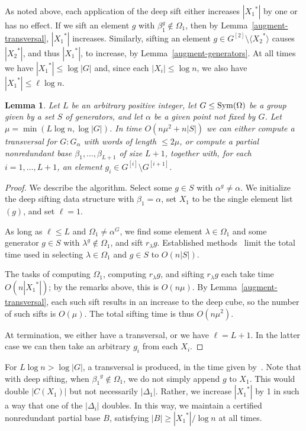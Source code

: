 \documentclass[12pt]{article}
\newcommand{\Sym}{{\rm Sym}}
\newtheorem{lemma}[theorem]{Lemma}
\begin{document}
As noted above, each application of the deep sift either
increases $|{X_1}^*|$ by one or has no effect.  
If we sift an element $g$
with $\beta_1^g\not\in\Omega_1$,
then by Lemma~\ref{augment-transversal}, $|{X_1}^*|$ increases.
Similarly, sifting an element 
$g\in G^{[2]}\setminus \langle {X_2}^*\rangle$ 
causes $|{X_2}^*|$, and thus $|{X_1}^*|$,
to increase, by Lemma~\ref{augment-generators}.
At all times we have $|{X_1}^*|\leq\log|G|$ and,
since each $|X_i|\leq\log n$,
we also have $|{X_1}^*|\leq\ell\log n$.

\begin{lemma}\label{transversal}
  Let $L$ be an arbitrary positive integer,
  let $G\leq\Sym(\Omega)$ be a
  group given by
  a set $S$ of generators, and let $\alpha$ be a given point not
  fixed by $G$.
  Let $\mu=\min(L\log n,\log|G|)$.
  In time $O(n\mu^2+n|S|)$ we can
  either compute a transversal for $G:G_\alpha$
  with words of length $\leq 2\mu$, or compute
  a partial nonredundant base  $\beta_1,\ldots,\beta_{L+1}$ of size $L+1$,
  together with, for each $i=1,\ldots,L+1$, an
  element $g_i\in G^{[i]}\setminus G^{[i+1]}$.
\end{lemma}
\begin{proof}
  We describe the algorithm.
  Select some $g\in S$
  with $\alpha^g\neq\alpha$.
  We initialize the
  deep sifting data structure with
  $\beta_1=\alpha$, set $X_1$ to be
  the single element list $(g)$, and set $\ell=1$.
  
  As long as $\ell\leq L$ and
  $\Omega_1\neq \alpha^G$, we find some element
  $\lambda\in\Omega_1$ and some generator $g\in S$
  with $\lambda^g\not\in\Omega_1$,
  and sift $r_\lambda g$.
  Established methods~\cite{seress-book}
  limit the total time used in
  selecting $\lambda\in\Omega_1$ and $g\in S$
  to $O(n|S|)$.

  The tasks of computing $\Omega_1$,
  computing $r_\lambda g$,
  and sifting $r_\lambda g$ each take time $O(n|{X_1}^*|)$;
  by the remarks above, this is $O(n\mu)$.
  By Lemma~\ref{augment-transversal},
  each such sift results in an increase to the
  deep cube, so the number of such sifts is $O(\mu)$.
  The total sifting time is thus $O(n\mu^2)$.
  
  At termination, we either have a transversal,
  or we have $\ell=L+1$. In the latter case
  we can then take an arbitrary $g_i$ from each $X_i$.
\end{proof}
For $L\log n>\log |G|$, a transversal is produced,
in the time given by~\cite[Lemma 4.4.2]{seress-book}.
Note that with deep sifting, when
${\beta_1}^g\not\in\Omega_1$, we do not
simply append $g$ to $X_1$. This would double
$|C(X_1)|$ but not necessarily $|\Delta_1|$. Rather, we increase
$|{X_1}^*|$ by 1 in such a way that one of the $|\Delta_i|$ doubles.
In this way, we maintain a certified nonredundant partial base $B$,
satisfying $|B|\geq|{X_1}^*|/\log n$ at all times.
\end{document}
